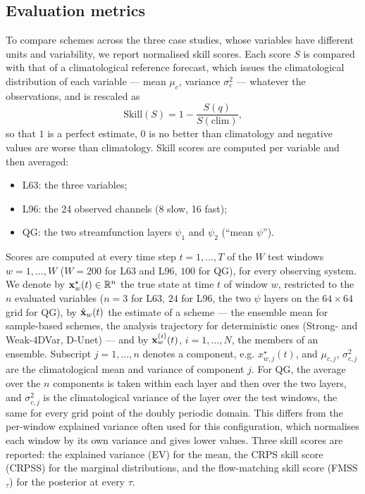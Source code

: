 \subsection{Evaluation metrics}\label{sec:scores}
To compare schemes across the three case studies, whose variables have different
units and variability, we report normalised skill scores. Each score $S$ is
compared with that of a climatological reference forecast, which issues the
climatological distribution of each variable --- mean $\mu_c$, variance
$\sigma_c^2$ --- whatever the observations, and is rescaled as
\begin{equation}\label{eq:skill}
  \mathrm{Skill}(S) = 1 - \frac{S(q)}{S(\text{clim})},
\end{equation}
so that $1$ is a perfect estimate, $0$ is no better than climatology and negative
values are worse than climatology. Skill scores are computed per variable and then
averaged:
\begin{itemize}[leftmargin=*,nosep]
  \item L63: the three variables;
  \item L96: the 24 observed channels (8 slow, 16 fast);
  \item QG: the two streamfunction layers $\psi_1$ and $\psi_2$ (``mean $\psi$'').
\end{itemize}
Scores are computed at every time step $t = 1, \dots, T$ of the $W$ test windows
$w = 1, \dots, W$ ($W = 200$ for L63 and L96, $100$ for QG), for every observing system.
We denote by $\mathbf{x}^\star_w(t) \in \mathbb{R}^n$ the true state at time $t$ of window $w$,
restricted to the $n$ evaluated variables ($n = 3$ for L63, $24$ for L96, the two $\psi$
layers on the $64 \times 64$ grid for QG), by $\hat{\mathbf{x}}_w(t)$ the estimate of a scheme ---
the ensemble mean for sample-based schemes, the analysis trajectory for deterministic
ones (Strong- and Weak-4DVar, D-Unet) --- and by $\mathbf{x}^{(i)}_w(t)$, $i = 1, \dots, N$,
the members of an ensemble. Subscript $j = 1, \dots, n$ denotes a component, e.g.
$x^\star_{w,j}(t)$, and $\mu_{c,j}$, $\sigma_{c,j}^2$ are the climatological mean and
variance of component $j$. For QG, the average over the $n$ components is taken within
each layer and then over the two layers, and $\sigma_{c,j}^2$ is the climatological variance of
the layer over the test windows, the same for every grid point of the doubly periodic domain.
This differs from the per-window explained variance often used for this configuration, which
normalises each window by its own variance and gives lower values. Three skill scores are reported: the explained
variance (EV) for the mean, the CRPS skill score (CRPSS) for the marginal
distributions, and the flow-matching skill score (FMSS$_\tau$) for the posterior at
every $\tau$.

